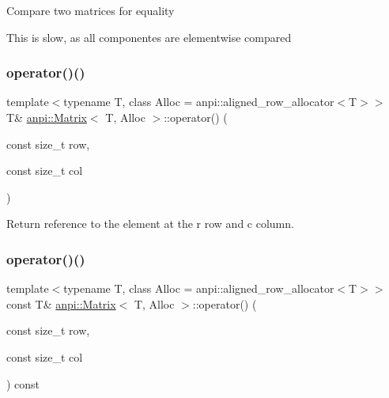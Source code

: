 Compare two matrices for equality

This is slow, as all componentes are elementwise compared \mbox{\label{classanpi_1_1Matrix_a956c10f1e9f46bdc4a09919f4ecc1de1}} 
\subsubsection{\texorpdfstring{operator()()}{operator()()}\hspace{0.1cm}{\footnotesize\ttfamily [1/2]}}
{\footnotesize\ttfamily template$<$typename T, class Alloc = anpi\+::aligned\+\_\+row\+\_\+allocator$<$\+T$>$$>$ \\
T\& \hyperlink{classanpi_1_1Matrix}{anpi\+::\+Matrix}$<$ T, Alloc $>$\+::operator() (\begin{DoxyParamCaption}\item[{const size\+\_\+t}]{row,  }\item[{const size\+\_\+t}]{col }\end{DoxyParamCaption})\hspace{0.3cm}{\ttfamily [inline]}}



Return reference to the element at the r row and c column. 

\mbox{\label{classanpi_1_1Matrix_adfd71caad2eb4c7b32b93e15217dc2cd}} 
\subsubsection{\texorpdfstring{operator()()}{operator()()}\hspace{0.1cm}{\footnotesize\ttfamily [2/2]}}
{\footnotesize\ttfamily template$<$typename T, class Alloc = anpi\+::aligned\+\_\+row\+\_\+allocator$<$\+T$>$$>$ \\
const T\& \hyperlink{classanpi_1_1Matrix}{anpi\+::\+Matrix}$<$ T, Alloc $>$\+::operator() (\begin{DoxyParamCaption}\item[{const size\+\_\+t}]{row,  }\item[{const size\+\_\+t}]{col }\end{DoxyParamCaption}) const\hspace{0.3cm}{\ttfamily [inline]}}



